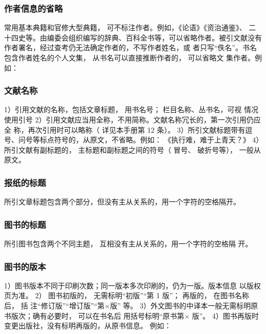 \documentclass{article}
\begin{document}
\subsubsection{作者信息的省略}
常用基本典籍和官修大型典籍， 可不标注作者。例如，《论语》《资治通鉴》、
二十四史等。由编委会组织编写的辞典、百科全书等，可以省略作者。被引文献没有作者署名，经过查考仍无法确定作者的，不写作者姓名，或
者只写“佚名”。书名包含作者姓名的个人文集， 从书名可以直接推断作者的， 可以省略文
集作者。例如：

\begin{quotation}

\end{quotation}


\subsubsection{文献名称}
1）引用文献的名称，包括文章标题， 用书名号； 栏目名称、丛书名，可视
情况使用引号
2）引用文献应当用全称，不用简称。文献名称冗长的，第一次引用仍应全
称，再次引用时可以略称（ 详见本手册第 12 条）。
3）所引文献标题带有逗号、问号等标点符号的，从原文，不省略。例如：
《执行难，难于上青天？》
4）所引文献有副标题的， 主标题和副标题之间的符号（ 冒号、 破折号等），
一般从原文。


\subsubsection{报纸的标题}
所引文章标题包含两个部分，但没有主从关系的，用一个字符的空格隔开。

\subsubsection{图书的标题}
所引图书包含两个不同主题， 互相没有主从关系的，用一个字符的空格隔
开。


\subsubsection{图书的版本}
1）图书版本不同于印刷次数；同一版本多次印刷的，仍为一版。版本信息
以版权页为准。
2） 图书初版的， 无需标明“初版”“第 1 版”； 再版的， 在图书名称后， 括
注“修订版”“增订版”“第×版” 等。
3）外文图书的中译本一般无需标明原书版次；确有必要时， 可以在书名后
用括号标明“原书第× 版”。
4）图书再版时变更出版社，没有标明再版的，从原书信息。 例如：
\end{document}
